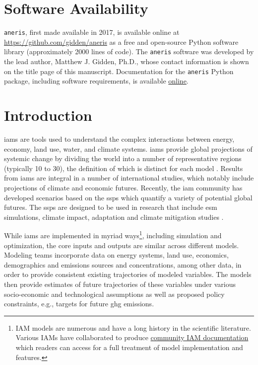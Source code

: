 \documentclass[review]{elsarticle}
\begin{document}
\linenumbers

\newpage
\section*{Software Availability}

\texttt{aneris}, first made available in 2017, is available online at
\url{https://github.com/gidden/aneris} as a free and open-source Python software
library (approximately 2000 lines of code). The \texttt{aneris} software was
developed by the lead author, Matthew J. Gidden, Ph.D., whose contact
information is shown on the title page of this manuscript. Documentation for the
\texttt{aneris} Python package, including software requirements, is available
\href{http://mattgidden.com/aneris/}{online}.

\newpage

\section{Introduction}

\glspl{iam} are tools used to understand the complex interactions between
energy, economy, land use, water, and climate systems. \glspl{iam} provide
global projections of systemic change by dividing the world into a number of
representative regions (typically 10 to 30), the definition of which is distinct
for each model \cite{krey_global_2014}. Results from \glspl{iam} are integral in
a number of international studies, which notably include projections of climate
and economic futures. Recently, the \gls{iam} community has developed scenarios
based on the \glspl{ssp} \cite{fujimori_ssp3:_2017, van_vuuren_energy_2017,
  calvin_ssp4:_2017, fricko_marker_2017, kriegler_fossil-fueled_2017} which
quantify a variety of potential global futures. The \glspl{ssp} are designed to
be used in research that include \gls{esm} simulations, climate impact,
adaptation and climate mitigation studies \cite{vuuren_new_2013}.

While \glspl{iam} are implemented in myriad ways\footnote{IAM models are
  numerous and have a long history in the scientific literature. Various IAMs
  have collaborated to produce
  \href{http://themasites.pbl.nl/models/advance/index.php/ADVANCE_wiki}{community
    IAM documentation} which readers can access for a full treatment of model
  implementation and features.}, including simulation and optimization, the core
inputs and outputs are similar across different models. Modeling teams
incorporate data on energy systems, land use, economics, demographics and
emissions sources and concentrations, among other data, in order to provide
consistent existing trajectories of modeled variables. The models then provide
estimates of future trajectories of these variables under various socio-economic
and technological assumptions as well as proposed policy constraints, e.g.,
targets for future \gls{ghg} emissions.
\end{document}
